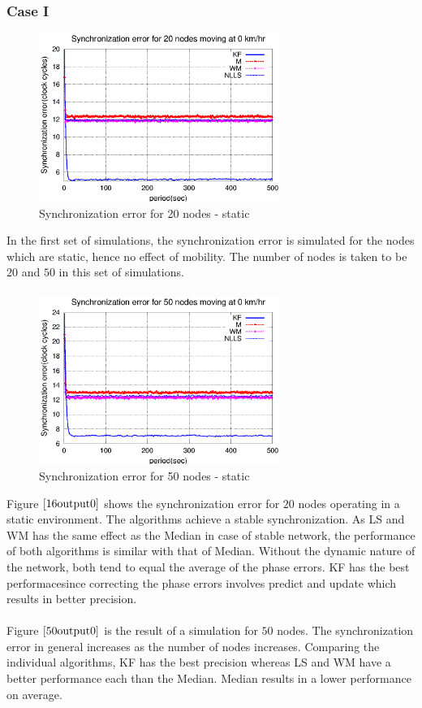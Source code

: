 \documentclass[a4paper,10pt]{report}
\begin{document}
\subsubsection{\textbf{Case I}}
\begin{figure}[!h]
\centering
\includegraphics[width= 0.7\textwidth]{16output-s0}
\caption{Synchronization error for 20 nodes - static} \label{16output0}
\end{figure}
In the first set of simulations, the synchronization error is
simulated for the nodes which are static, hence no effect of
mobility. The number of nodes is taken to be $20$ and $50$ in this
set of simulations.  \paragraph*{}
\begin{figure}
\centering
\includegraphics[width= 0.7\textwidth]{50output-s0}
\caption{Synchronization error for 50 nodes - static} \label{50output0}
\end{figure}
Figure $\ref{16output0}$ shows the synchronization error for $20$
nodes operating in a static environment. The algorithms achieve a
stable synchronization. As LS and WM has the same effect as the
Median in case of stable network, the performance of both algorithms
is similar with that of Median. Without the dynamic nature of the
network, both tend to equal the average of the phase errors. KF has
the best performacesince correcting the phase errors involves
predict and update which results in better precision. \paragraph*{}
Figure $\ref{50output0}$ is the result of a simulation for $50$
nodes. The synchronization error in general increases as the number
of nodes increases. Comparing the individual algorithms, KF has the best
precision whereas LS and WM have a better performance
each than the Median. Median results in a lower performance on average.
\end{document}
